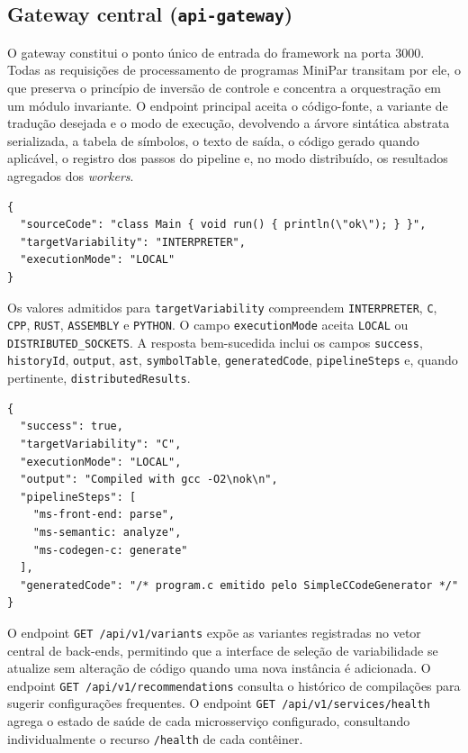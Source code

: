 
\subsection{Gateway central (\texttt{api-gateway})}

O gateway constitui o ponto único de entrada do framework na porta 3000. Todas as requisições de processamento de programas MiniPar transitam por ele, o que preserva o princípio de inversão de controle e concentra a orquestração em um módulo invariante. O endpoint principal aceita o código-fonte, a variante de tradução desejada e o modo de execução, devolvendo a árvore sintática abstrata serializada, a tabela de símbolos, o texto de saída, o código gerado quando aplicável, o registro dos passos do pipeline e, no modo distribuído, os resultados agregados dos \emph{workers}.

\begin{lstlisting}[caption={Corpo da requisição \texttt{POST /api/v1/process}}]
{
  "sourceCode": "class Main { void run() { println(\"ok\"); } }",
  "targetVariability": "INTERPRETER",
  "executionMode": "LOCAL"
}
\end{lstlisting}

Os valores admitidos para \texttt{targetVariability} compreendem \texttt{INTERPRETER}, \texttt{C}, \texttt{CPP}, \texttt{RUST}, \texttt{ASSEMBLY} e \texttt{PYTHON}. O campo \texttt{executionMode} aceita \texttt{LOCAL} ou \texttt{DISTRIBUTED\_SOCKETS}. A resposta bem-sucedida inclui os campos \texttt{success}, \texttt{historyId}, \texttt{output}, \texttt{ast}, \texttt{symbolTable}, \texttt{generatedCode}, \texttt{pipelineSteps} e, quando pertinente, \texttt{distributedResults}.

\begin{lstlisting}[caption={Trecho representativo da resposta agregada pelo gateway}]
{
  "success": true,
  "targetVariability": "C",
  "executionMode": "LOCAL",
  "output": "Compiled with gcc -O2\nok\n",
  "pipelineSteps": [
    "ms-front-end: parse",
    "ms-semantic: analyze",
    "ms-codegen-c: generate"
  ],
  "generatedCode": "/* program.c emitido pelo SimpleCCodeGenerator */"
}
\end{lstlisting}

O endpoint \texttt{GET /api/v1/variants} expõe as variantes registradas no vetor central de back-ends, permitindo que a interface de seleção de variabilidade se atualize sem alteração de código quando uma nova instância é adicionada. O endpoint \texttt{GET /api/v1/recommendations} consulta o histórico de compilações para sugerir configurações frequentes. O endpoint \texttt{GET /api/v1/services/health} agrega o estado de saúde de cada microsserviço configurado, consultando individualmente o recurso \texttt{/health} de cada contêiner.

